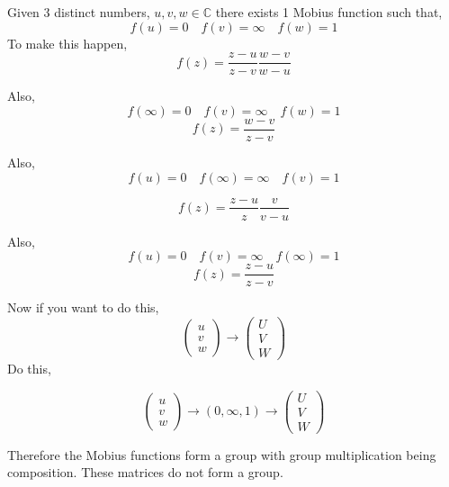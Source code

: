 \documentclass[letter]{article}
\begin{document}
Given $3$ distinct numbers, $u,v,w \in \mathbb{C}$ there exists 1 Mobius function such that, 
\[
f(u) = 0 \quad f(v) = \infty \quad f(w) = 1
\]
To make this happen, 
\[
f(z) = \frac{z - u}{z - v}  \frac{w - v}{w - u}
\]

Also, 
\[
f(\infty) = 0 \quad f(v) = \infty \quad f(w) = 1
\]
\[
f(z) =  \frac{w- v}{z-v}
\] 

Also, 
\[
f(u) = 0 \quad f(\infty) = \infty \quad f(v) = 1
\]  

\[
f(z) = \frac{z-u}{z} \frac{v }{v-u}
\]

Also, 
\[
f(u) = 0 \quad f(v) = \infty \quad f(\infty) = 1
\] 
\[
f(z) = \frac{z-u}{z-v}
\] 

Now if you want to do this,
\[
\begin{pmatrix} u \\ v \\ w \end{pmatrix}  \to  \begin{pmatrix} U \\ V  \\  W \end{pmatrix} 
\] 
Do this, 

\[
\begin{pmatrix} u \\ v \\ w \end{pmatrix}  \to  (0, \infty, 1) \to \begin{pmatrix} U \\ V  \\  W \end{pmatrix} 
\]

Therefore the Mobius functions form a group with group multiplication being composition. These matrices do not form a group.  
\end{document}
